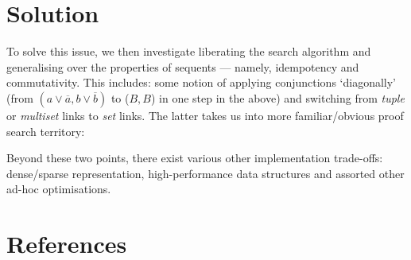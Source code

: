 \documentclass{article}
\newcommand\0{0}
\newcommand\1{1}
\newcommand\+{+}
\renewcommand\*{\times}
\theoremstyle{indented}
\newcommand\dual{\overline}
\begin{document}
    \section*{Solution}
        To solve this issue, we then investigate liberating the search algorithm and generalising over the properties of sequents --- namely, idempotency and commutativity.
        This includes: some notion of applying conjunctions `diagonally' (from $(a \vee \dual a, b \vee \dual b)$ to ($B, B$) in one step in the above) and switching from \textit{tuple} or \textit{multiset} links to \textit{set} links.
        The latter takes us into more familiar/obvious proof search territory:
        \begin{figure}[H]
            \def\x{1cm}
            \def\y{1cm}
            \centering
        \end{figure}
        Beyond these two points, there exist various other implementation trade-offs: dense/sparse representation, high-performance data structures and assorted other ad-hoc optimisations.


    \section*{References}
        
\end{document}
